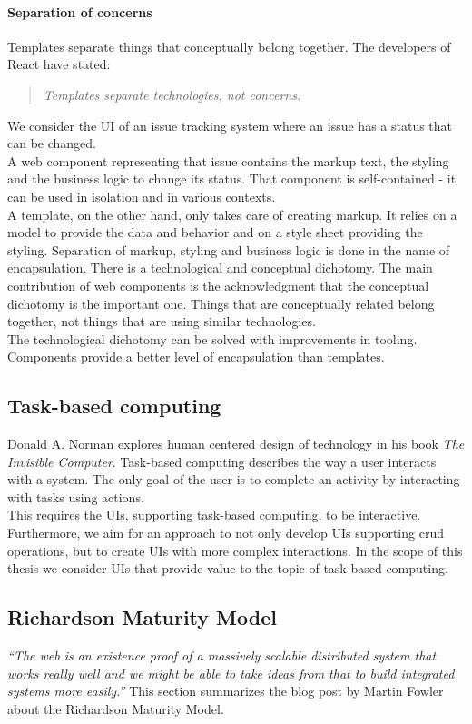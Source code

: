 \paragraph{Separation of concerns} Templates separate things that conceptually belong together. The developers of React have stated:
\begin{quote}
\textit{Templates separate technologies, not concerns.}
\end{quote}
We consider the UI of an issue tracking system where an issue has a status that can be changed. \\ A web component representing that issue contains the markup text, the styling and the business logic to change its status. That component is self-contained - it can be used in isolation and in various contexts. \\
A template, on the other hand, only takes care of creating markup. It relies on a model to provide the data and behavior and on a style sheet providing the styling.
Separation of markup, styling and business logic is done in the name of encapsulation. There is a technological and conceptual dichotomy. The main contribution of web components is the acknowledgment that the conceptual dichotomy is the important one. Things that are conceptually related belong together, not things that are using similar technologies. \\
The technological dichotomy can be solved with improvements in tooling. Components provide a better level of encapsulation than templates.

\subsection{Task-based computing}
Donald A. Norman explores human centered design of technology in his book \textit{The Invisible Computer}. Task-based computing describes the way a user interacts with a system. The only goal of the user is to complete an activity by interacting with tasks using actions. \citep{invisiblecomputer} \\
This requires the UIs, supporting task-based computing, to be interactive. Furthermore, we aim for an approach to not only develop UIs supporting \gls{crud} operations, but to create UIs with more complex interactions. In the scope of this thesis we consider UIs that provide value to the topic of task-based computing.

\subsection{Richardson Maturity Model}\label{richardsonmaturitymodel}
\textit{``The web is an existence proof of a massively scalable distributed system that works really well and we might be able to take ideas from that to build integrated systems more easily.''} \citep{richardsonmaturitymodel} This section summarizes the blog post by Martin Fowler about the Richardson Maturity Model.

